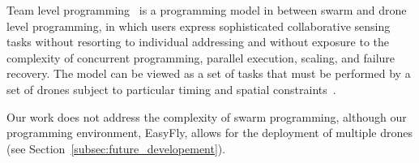 Team level programming~\cite{mottola2014team} is a programming model in between swarm and drone level programming, 
in which users express sophisticated collaborative sensing tasks without resorting to individual addressing 
and without exposure to the complexity of concurrent programming, parallel execution, scaling, and failure recovery.
The model can be viewed as a set of tasks that must be performed by a set of drones subject to particular timing and spatial constraints~\cite{mottola2014team}.

Our work does not address the complexity of swarm programming, although our programming environment, EasyFly, allows for the deployment of multiple drones (see Section~\ref{subsec:future_developement}).